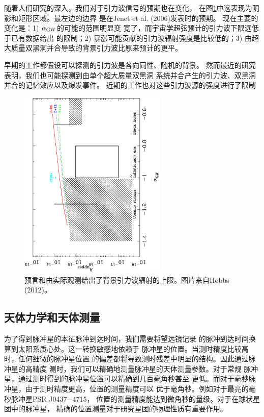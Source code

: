 随着人们研究的深入，我们对于引力波信号的预期也在变化，
在图\ref{limit}中这表现为阴影和矩形区域。最左边的边界
是在Jenet et al. (2006)\supercite{jhv+06}发表时的预期。
现在主要的变化是：1) $\alpha_{\rm{GW}}$的可能的范围明显变
宽了，而宇宙学超弦预计的引力波下限远低于已有数据给出
的限制；2) 暴涨可能贡献的引力波辐射强度是比较低的；3) 
由超大质量双黑洞并合导致的背景引力波比原来预计的更平。

早期的工作都假设可以探测的引力波是各向同性、随机的背景。
然而最近的研究表明，我们也可能探测到由单个超大质量双黑洞
系统并合产生的引力波、双黑洞并合的记忆效应以及爆发事件。
近期的工作也对这些引力波源的强度进行了限制\supercite{Wang15,Zhu14}

\begin{figure}
\centering
\includegraphics[width=7cm,angle=-90,trim=1cm 1cm 0cm 1cm]{limit.ps}
\caption{预言和由实际观测给出了背景引力波辐射的上限。图片来自Hobbs (2012)\supercite{hobbs12b}。}
\label{limit}
\end{figure}

\subsection{天体力学和天体测量}

为了得到脉冲星的本征脉冲到达时间，我们需要将望远镜记录
的脉冲到达时间换算到太阳系质心处。这一转换敏感地依赖于
脉冲星的位置。当测时精度比较高时，任何细微的脉冲星位置
的偏差都将导致测时残差中明显的结构。因此通过脉冲星的高精度
测时，我们可以精确地测量脉冲星的天体测量参数。对于常规
脉冲星，通过测时得到的脉冲星位置可以精确到几百毫角秒甚至
更低。而对于毫秒脉冲星，由于测时精度更高，位置的测量精度可以
优于毫角秒。例如对于最亮的毫秒脉冲星PSR J0437$-$4715，
位置的测量精度能达到微角秒的量级。对于在球状星团中的脉冲星，
精确的位置测量对于研究星团的物理性质有重要作用。


